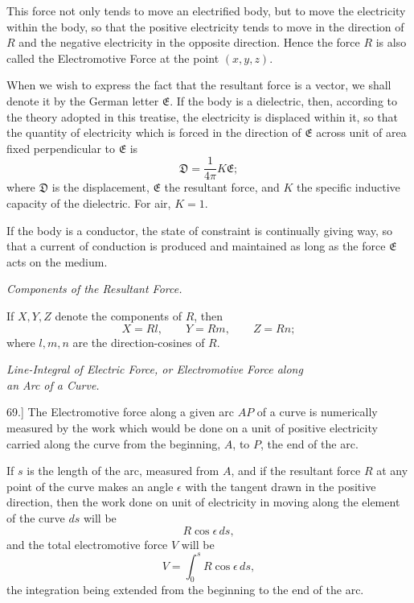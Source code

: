 \documentclass[11pt,a4paper]{article}
\begin{document}
This force not only tends to move an electrified body, but to move the
electricity within the body, so that the positive electricity tends to
move in the direction of \(R\) and the negative electricity in the opposite
direction. Hence the force \(R\) is also called the Electromotive Force
at the point \((x,y,z)\).

When we wish to express the fact that the resultant force is a vector,
we shall denote it by the German letter \(\mathfrak{E}\). If the body is a
dielectric, then, according to the theory adopted in this treatise, the
electricity is displaced within it, so that the quantity of electricity
which is forced in the direction of \(\mathfrak{E}\) across unit of area fixed
perpendicular to \(\mathfrak{E}\) is
\[
\mathfrak{D}=\frac{1}{4\pi}K\mathfrak{E};
\]
where \(\mathfrak{D}\) is the displacement, \(\mathfrak{E}\) the resultant force,
and \(K\) the specific inductive capacity of the dielectric. For air,
\(K=1\).

If the body is a conductor, the state of constraint is continually
giving way, so that a current of conduction is produced and maintained
as long as the force \(\mathfrak{E}\) acts on the medium.

\begin{center}
\textit{Components of the Resultant Force.}
\end{center}

If \(X,Y,Z\) denote the components of \(R\), then
\[
X=Rl,\qquad Y=Rm,\qquad Z=Rn;
\]
where \(l,m,n\) are the direction-cosines of \(R\).

\clearpage
\setcounter{footnote}{0}

\begin{center}
\textit{Line-Integral of Electric Force, or Electromotive Force along\\
an Arc of a Curve.}
\end{center}

69.] The Electromotive force along a given arc \(AP\) of a curve is
numerically measured by the work which would be done on a unit of
positive electricity carried along the curve from the beginning, \(A\),
to \(P\), the end of the arc.

If \(s\) is the length of the arc, measured from \(A\), and if the
resultant force \(R\) at any point of the curve makes an angle \(\epsilon\)
with the tangent drawn in the positive direction, then the work done on
unit of electricity in moving along the element of the curve \(ds\) will
be
\[
R\cos\epsilon\,ds,
\]
and the total electromotive force \(V\) will be
\[
V=\int_0^s R\cos\epsilon\,ds,
\]
the integration being extended from the beginning to the end of the arc.
\end{document}
